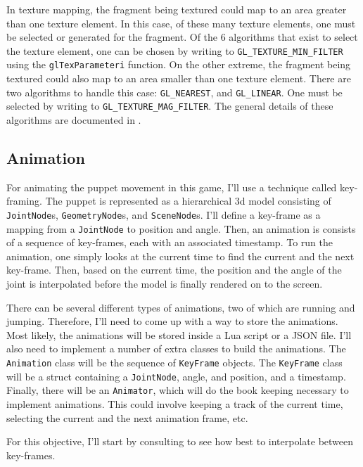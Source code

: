 \documentclass[11pt]{article}
\begin{document}
In texture mapping, the fragment being textured could map to an area greater than one texture element. In this case, of these many texture elements, one must be selected or generated for the fragment. Of the 6 algorithms that exist to select the texture element, one can be chosen by writing to \verb|GL_TEXTURE_MIN_FILTER| using the \verb|glTexParameteri| function. On the other extreme, the fragment being textured could also map to an area smaller than one texture element. There are two algorithms to handle this case: \verb|GL_NEAREST|, and \verb|GL_LINEAR|. One must be selected by writing to \verb|GL_TEXTURE_MAG_FILTER|. The general details of these algorithms are documented in \cite{gl-tex-parameter}.

\subsection*{Animation}
For animating the puppet movement in this game, I'll use a technique called key-framing. The puppet is represented as a hierarchical 3d model consisting of \verb|JointNode|s, \verb|GeometryNode|s, and \verb|SceneNode|s. I'll define a key-frame as a mapping from a \verb|JointNode| to position and angle. Then, an animation is consists of a sequence of key-frames, each with an associated timestamp. To run the animation, one simply looks at the current time to find the current and the next key-frame. Then, based on the current time, the position and the angle of the joint is interpolated before the model is finally rendered on to the screen.

There can be several different types of animations, two of which are running and jumping. Therefore, I'll need to come up with a way to store the animations. Most likely, the animations will be stored inside a Lua script or a JSON file. I'll also need to implement a number of extra classes to build the animations. The \verb|Animation| class will be the sequence of \verb|KeyFrame| objects. The \verb|KeyFrame| class will be a struct containing a \verb|JointNode|, angle, and position, and a timestamp. Finally, there will be an \verb|Animator|, which will do the book keeping necessary to implement animations. This could involve keeping a track of the current time, selecting the current and the next animation frame, etc.

For this objective, I'll start by consulting \cite{interactive-computer-graphics} to see how best to interpolate between key-frames.
\end{document}
